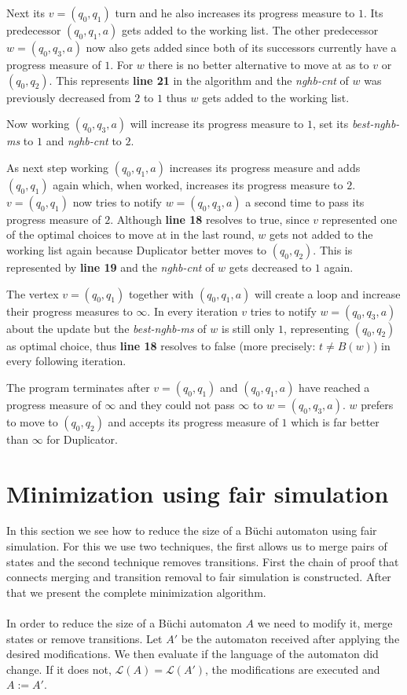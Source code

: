 \documentclass[12pt,oneside,bibliography=totoc,abstracton]{scrartcl}
\begin{document}
Next its $v = (q_0, q_1)$ turn and he also increases its progress measure to $1$. Its predecessor $(q_0, q_1, a)$ gets
added to the working list. The other predecessor $w = (q_0, q_3, a)$ now also gets added since both of its successors
currently have a progress measure of $1$. For $w$ there is no better alternative to move at as to $v$ or $(q_0, q_2)$.
This represents \textbf{line 21} in the algorithm and the \textit{nghb-cnt} of $w$ was previously decreased
from $2$ to $1$ thus $w$ gets added to the working list.

Now working $(q_0, q_3, a)$ will increase its progress measure to $1$, set its \textit{best-nghb-ms} to $1$ and \textit{nghb-cnt} to $2$.

As next step working $(q_0, q_1, a)$ increases its progress measure and adds $(q_0, q_1)$ again which,
when worked, increases its progress measure to $2$. $v = (q_0, q_1)$ now tries to notify $w = (q_0, q_3, a)$
a second time to pass its progress measure of $2$. Although \textbf{line 18} resolves to true, since $v$ represented one of
the optimal choices to move at in the last round, $w$ gets not added to the working list again because Duplicator better
moves to $(q_0, q_2)$. This is represented by \textbf{line 19} and the \textit{nghb-cnt} of $w$ gets decreased to $1$ again.

The vertex $v = (q_0, q_1)$ together with $(q_0, q_1, a)$ will create a loop and increase their progress measures to $\infty$.
In every iteration $v$ tries to notify $w = (q_0, q_3, a)$ about the update but the \textit{best-nghb-ms} of $w$ is still
only $1$, representing $(q_0, q_2)$ as optimal choice, thus \textbf{line 18} resolves to false (more precisely: $t \ne B(w)$)
in every following iteration.

The program terminates after $v = (q_0, q_1)$ and $(q_0, q_1, a)$ have reached a progress measure of $\infty$ and they
could not pass $\infty$ to $w = (q_0, q_3, a)$. $w$ prefers to move to $(q_0, q_2)$ and accepts its progress
measure of $1$ which is far better than $\infty$ for Duplicator.

\section{Minimization using fair simulation}\label{section_minimization}
In this section we see how to reduce the size of a Büchi automaton using fair simulation.
For this we use two techniques, the first allows us to merge pairs of states and the second technique removes transitions.
First the chain of proof that connects merging and transition removal to fair simulation is constructed.
After that we present the complete minimization algorithm.\\\\
In order to reduce the size of a Büchi automaton $A$ we need to modify it,
merge states or remove transitions. Let $A'$ be the automaton
received after applying the desired modifications. We then evaluate if the language of the automaton did change.
If it does not, $\mathcal{L}(A) = \mathcal{L}(A')$, the modifications are executed and $A := A'$.
\end{document}
